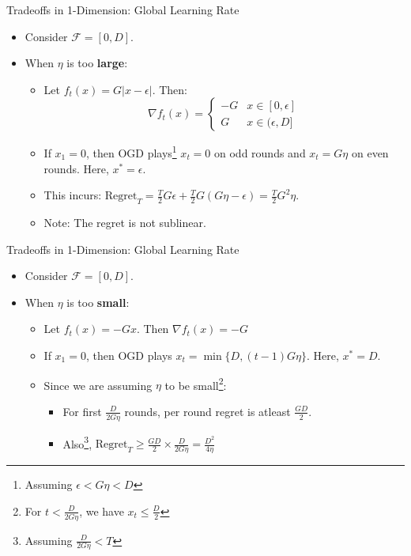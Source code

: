 \documentclass[
	11pt, %
]{beamer}
\begin{document}
\begin{frame}{Tradeoffs in 1-Dimension: Global Learning Rate}
    \begin{itemize}
        \item Consider $\mathcal{F} = [0,D]$.
        \item When $\eta$ is too \textbf{large}:
            \begin{itemize}
                \item Let $f_t(x) = G |x-\epsilon|$. Then:
                $$
                \nabla f_t(x) = \begin{cases}
                    -G & x \in [0,\epsilon] \\
                    G & x \in (\epsilon, D]
                \end{cases}
                $$
                \item If $x_1 = 0$, then OGD plays\footnote{Assuming $\epsilon < G\eta < D$} $x_t = 0$ on odd rounds and $x_t = G\eta$ on even rounds. Here, $x^* = \epsilon$.
                \item This incurs: $\text{Regret}_T = \frac{T}{2} G \epsilon + \frac{T}{2} G(G\eta - \epsilon) = \frac{T}{2} G^2 \eta$.
                \item Note: The regret is not sublinear.
            \end{itemize}
    \end{itemize}
\end{frame}

\begin{frame}{Tradeoffs in 1-Dimension: Global Learning Rate}
    \begin{itemize}
        \item Consider $\mathcal{F} = [0,D]$.
        \item When $\eta$ is too \textbf{small}:
            \begin{itemize}
                \item Let $f_t(x) = -Gx$. Then $\nabla f_t(x) = -G$
                \item If $x_1 = 0$, then OGD plays $x_t = \min \{D, (t-1)G\eta \}$. Here, $x^* = D$.
                \item Since we are assuming $\eta$ to be small\footnote{For $t < \frac{D}{2 G\eta }$, we have $x_t \le \frac{D}{2}$}:
                \begin{itemize}
                    \item For first $\frac{D}{2G\eta}$ rounds, per round regret is atleast $\frac{GD}{2}$.
                    \item Also\footnote{Assuming $\frac{D}{2G\eta} < T$}, $\text{Regret}_T \ge \frac{GD}{2} \times \frac{D}{2G\eta} = \frac{D^2}{4\eta}$
                \end{itemize}
            \end{itemize}
    \end{itemize}
\end{frame}
\end{document}
